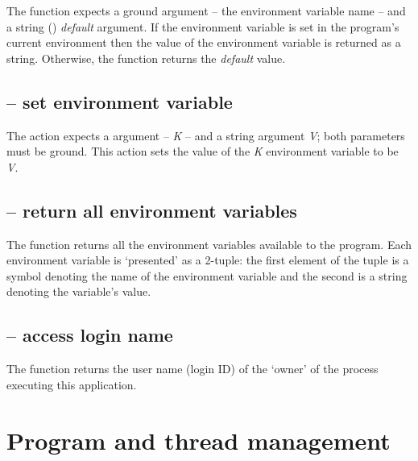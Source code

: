      
The  function expects a ground  argument -- the environment variable name -- and a string () \emph{default} argument. If the environment variable is set in the program's current environment then the value of the environment variable is returned as a string. Otherwise, the  function returns the \emph{default} value.

\subsection{ -- set environment variable}
\label{misc:setenv}

     
The  action expects a  argument -- \emph{K} -- and a string  argument \emph{V}; both parameters must be ground. This action sets the value of the \emph{K} environment variable to be \emph{V}.

\subsection{ -- return all environment variables}
\label{misc:envir}


The  function returns all the environment variables available to the program. Each environment variable is `presented' as a 2-tuple: the first element of the tuple is a symbol denoting the name of the environment variable and the second is a string denoting the variable's value.

\subsection{ -- access login name}
\label{misc:getlogin}

     
The  function returns the user name (login ID) of the `owner' of the process executing this \go application.

\section{Program and thread management}
\label{misc:process}

